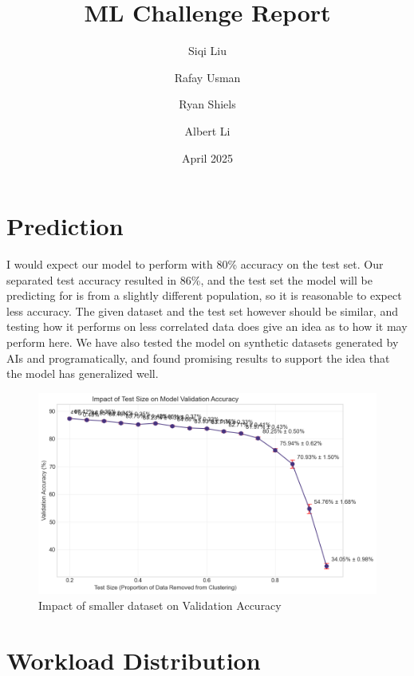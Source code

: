 \documentclass[journal]{IEEEtran}
\title{ML Challenge Report}
\author{
  Siqi Liu
  \and
  Rafay Usman
  \and
  Ryan Shiels
  \and
  Albert Li
}
\date{April 2025}
\begin{document}
\maketitle





\section{Prediction}
I would expect our model to perform with 80\% accuracy on the test set. Our separated test accuracy resulted in 86\%, and the test set the model will be predicting for is from a slightly different population, so it is reasonable to expect less accuracy.
The given dataset and the test set however should be similar, and testing how it performs on less correlated data does give an idea as to how it may perform here. We have also tested the model on synthetic datasets generated by AIs and programatically, and found promising results to support the idea that the model has generalized well.
\begin{figure}[ht]
  \centerline{\includegraphics[width=\columnwidth]{TestSize.png}}
  \caption{Impact of smaller dataset on Validation Accuracy}
  \label{f:testsize_diagram}
\end{figure}


\section{Workload Distribution}
\end{document}
